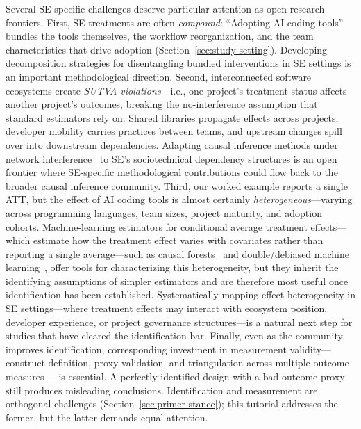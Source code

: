 Several SE-specific challenges deserve particular attention as open research frontiers.
First, SE treatments are often \emph{compound}: ``Adopting AI coding tools'' bundles the tools themselves, the workflow reorganization, and the team characteristics that drive adoption (Section~\ref{sec:study-setting}).
Developing decomposition strategies for disentangling bundled interventions in SE settings is an important methodological direction.
Second, interconnected software ecosystems create \emph{SUTVA violations}---i.e., one project's treatment status affects another project's outcomes, breaking the no-interference assumption that standard estimators rely on: Shared libraries propagate effects across projects, developer mobility carries practices between teams, and upstream changes spill over into downstream dependencies.
Adapting causal inference methods under network interference~\cite{savje2021average, forastiere2021identification} to SE's sociotechnical dependency structures is an open frontier where SE-specific methodological contributions could flow back to the broader causal inference community.
Third, our worked example reports a single ATT, but the effect of AI coding tools is almost certainly \emph{heterogeneous}---varying across programming languages, team sizes, project maturity, and adoption cohorts.
Machine-learning estimators for conditional average treatment effects---which estimate how the treatment effect varies with covariates rather than reporting a single average---such as causal forests~\cite{wager2018estimation} and double/debiased machine learning~\cite{chernozhukov2018double}, offer tools for characterizing this heterogeneity, but they inherit the identifying assumptions of simpler estimators and are therefore most useful once identification has been established.
Systematically mapping effect heterogeneity in SE settings---where treatment effects may interact with ecosystem position, developer experience, or project governance structures---is a natural next step for studies that have cleared the identification bar.
Finally, even as the community improves identification, corresponding investment in measurement validity---construct definition, proxy validation, and triangulation across multiple outcome measures~\cite{lawlor2016triangulation}---is essential.
A perfectly identified design with a bad outcome proxy still produces misleading conclusions.
Identification and measurement are orthogonal challenges (Section~\ref{sec:primer-stance}); this tutorial addresses the former, but the latter demands equal attention.

